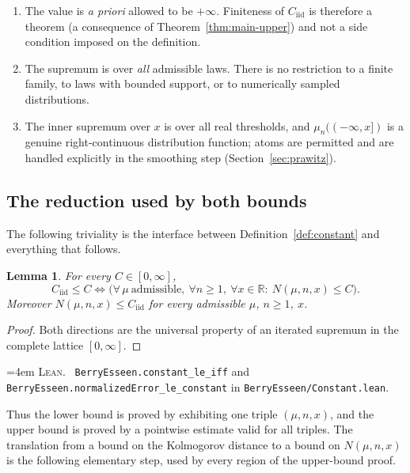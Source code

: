 \documentclass[10pt,a4paper]{article}
\theoremstyle{plain}
\newtheorem{lemma}[theorem]{Lemma}
\theoremstyle{definition}
\newcommand{\R}{\mathbb{R}}
\newcommand{\Cii}{C_{\mathrm{iid}}}
\newcommand{\lean}[1]{\texttt{#1}}
\newcommand{\file}[1]{\texttt{#1}}
\newenvironment{leanref}%
  {\par\addvspace{3pt}\begingroup\sloppy\emergencystretch=4em
   \noindent\footnotesize\textsc{Lean.}\ \ignorespaces}%
  {\par\endgroup\addvspace{3pt}}
\begin{document}
\begin{enumerate}[leftmargin=2.2em]
\item The value is \emph{a priori} allowed to be $+\infty$. Finiteness of
  $\Cii$ is therefore a theorem (a consequence of
  Theorem~\ref{thm:main-upper}) and not a side condition imposed on the
  definition.
\item The supremum is over \emph{all} admissible laws. There is no restriction
  to a finite family, to laws with bounded support, or to numerically sampled
  distributions.
\item The inner supremum over $x$ is over all real thresholds, and
  $\mu_n(({-\infty},x])$ is a genuine right-continuous distribution function;
  atoms are permitted and are handled explicitly in the smoothing step
  (Section~\ref{sec:prawitz}).
\end{enumerate}

\subsection{The reduction used by both bounds}

The following triviality is the interface between
Definition~\ref{def:constant} and everything that follows.

\begin{lemma}\label{lem:reduction}
For every $C\in[0,\infty]$,
\[
  \Cii \le C
  \iff
  \bigl(\forall\,\mu\ \mathrm{admissible},\ \forall n\ge1,\ \forall x\in\R:\
    N(\mu,n,x)\le C\bigr).
\]
Moreover $N(\mu,n,x)\le\Cii$ for every admissible $\mu$, $n\ge1$, $x$.
\end{lemma}

\begin{proof}
Both directions are the universal property of an iterated supremum in the
complete lattice $[0,\infty]$.
\end{proof}

\begin{leanref}
\lean{BerryEsseen.constant\_le\_iff} and
\lean{BerryEsseen.normalizedError\_le\_constant} in
\file{BerryEsseen/Constant.lean}.
\end{leanref}

Thus the lower bound is proved by exhibiting one triple $(\mu,n,x)$, and the
upper bound is proved by a pointwise estimate valid for all triples. The
translation from a bound on the Kolmogorov distance to a bound on
$N(\mu,n,x)$ is the following elementary step, used by every region of the
upper-bound proof.
\end{document}

